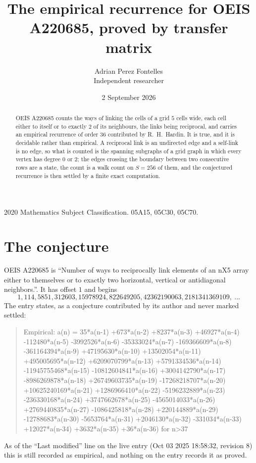 \documentclass[11pt,a4paper]{article}
\title{The empirical recurrence for OEIS A220685, proved by transfer matrix}
\author{Adrian Perez Fontelles\\ \small Independent researcher}
\date{2 September 2026}
\theoremstyle{plain}
\theoremstyle{definition}
\begin{document}
\maketitle

\begin{abstract}
OEIS A220685 counts the ways of linking the cells of a grid $5$ cells wide, each cell either to
itself or to exactly $2$ of its neighbours, the links being reciprocal, and carries an
empirical recurrence of order $36$ contributed by R.~H.~Hardin. It is true, and it is
decidable rather than empirical. A reciprocal link is an undirected edge and a self-link is
no edge, so what is counted is the spanning subgraphs of a grid graph in which every vertex
has degree $0$ or $2$; the edges crossing the boundary between two consecutive rows are a
state, the count is a walk count on $S=256$ of them, and the conjectured recurrence is then
settled by a finite exact computation.
\end{abstract}

\noindent\small 2020 Mathematics Subject Classification. 05A15, 05C30, 05C70.\normalsize

\section{The conjecture}

OEIS A220685 is ``Number of ways to reciprocally link elements of an nX5 array either to themselves or to exactly two horizontal, vertical or antidiagonal neighbors.''. It has offset $1$ and begins
\[
1, 114, 5851, 312603, 15978924, 822649205, 42362190063, 2181341369109,\ \dots
\]
The entry states, as a conjecture contributed by its author and never marked settled:
\begin{quote}
Empirical: a(n) = 35*a(n-1) +673*a(n-2) +8237*a(n-3) +46927*a(n-4) -112480*a(n-5) -3992526*a(n-6) -35333024*a(n-7) -169366609*a(n-8) -361164394*a(n-9) +47195630*a(n-10) +13502054*a(n-11) +495005695*a(n-12) +6209070799*a(n-13) +5791334536*a(n-14) -11945755468*a(n-15) -10812604841*a(n-16) +3004142790*a(n-17) -8986269878*a(n-18) +26749603735*a(n-19) -17268218707*a(n-20) +10625240169*a(n-21) +1286966410*a(n-22) -5196232889*a(n-23) -236330168*a(n-24) +3747662678*a(n-25) -4565014033*a(n-26) +2769440835*a(n-27) -1086425818*a(n-28) +220144889*a(n-29) -12788683*a(n-30) -5653764*a(n-31) +2046130*a(n-32) -331034*a(n-33) +12027*a(n-34) +3632*a(n-35) +36*a(n-36) for n>37
\end{quote}
As of the ``Last modified'' line on the live entry (Oct 03 2025 18:58:32, revision 8) this is still
recorded as empirical, and nothing on the entry records it as proved.
\end{document}
